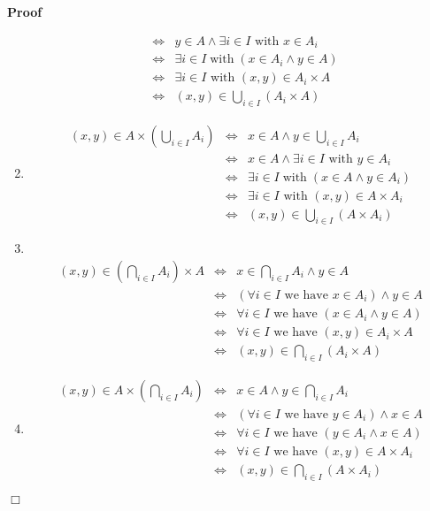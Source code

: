 \documentclass{book}
\newcommand{\tmop}[1]{\ensuremath{\operatorname{#1}}}
\newenvironment{proof}{\noindent\textbf{Proof\ }}{\hspace*{\fill}$\Box$\medskip}
\begin{document}
\begin{proof}
\begin{enumerate}
\begin{eqnarray*}
      & \Leftrightarrow & y \in A \wedge \exists i \in I \text{ with } x \in
      A_i\\
      & \Leftrightarrow & \exists i \in I \tmop{with} (x \in A_i \wedge y \in
      A)\\
      & \Leftrightarrow & \exists i \in I \text{ with } (x, y) \in A_i \times
      A\\
      & \Leftrightarrow & (x, y) \in \bigcup_{i \in I} (A_i \times A)
    \end{eqnarray*}
    \item 
    \begin{eqnarray*}
      (x, y) \in A \times \left( \bigcup_{i \in I} A_i \right) &
      \Leftrightarrow & x \in A \wedge y \in \bigcup_{i \in I} A_i\\
      & \Leftrightarrow & x \in A \wedge \exists i \in I \text{ with } y \in
      A_i\\
      & \Leftrightarrow & \exists i \in I \tmop{with} (x \in A \wedge y \in
      A_i)\\
      & \Leftrightarrow & \exists i \in I \text{ with } (x, y) \in A \times
      A_i\\
      & \Leftrightarrow & (x, y) \in \bigcup_{i \in I} (A \times A_i)
    \end{eqnarray*}
    \item  \
    \begin{eqnarray*}
      (x, y) \in \left( \bigcap_{i \in I} A_i \right) \times A &
      \Leftrightarrow & x \in \bigcap_{i \in I} A_i \wedge y \in A\\
      & \Leftrightarrow & \left( \forall i \in I \text{ we have } x \in A_i
      \right) \wedge y \in A\\
      & \Leftrightarrow & \forall i \in I \text{ we have } (x \in A_i \wedge
      y \in A)\\
      & \Leftrightarrow & \forall i \in I \text{ we have } (x, y) \in A_i
      \times A\\
      & \Leftrightarrow & (x, y) \in \bigcap_{i \in I} (A_i \times A)
    \end{eqnarray*}
    \item
    \begin{eqnarray*}
      (x, y) \in A \times \left( \bigcap_{i \in I} A_i \right) &
      \Leftrightarrow & x \in A \wedge y \in \bigcap_{i \in I} A_i\\
      & \Leftrightarrow & \left( \forall i \in I \text{ we have } y \in A_i
      \right) \wedge x \in A\\
      & \Leftrightarrow & \forall i \in I \text{ we have } (y \in A_i \wedge
      x \in A)\\
      & \Leftrightarrow & \forall i \in I \text{ we have } (x, y) \in A
      \times A_i\\
      & \Leftrightarrow & (x, y) \in \bigcap_{i \in I} (A \times A_i)
    \end{eqnarray*}
  \end{enumerate}
\end{proof}
\end{document}
